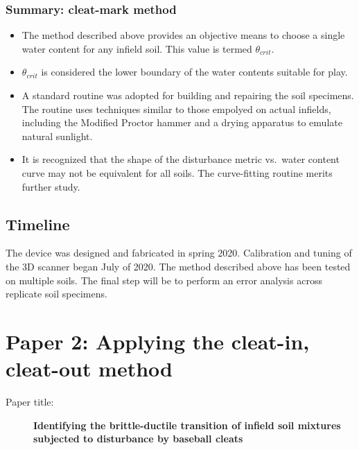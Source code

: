 \documentclass[
  letterpaper,
  openany]{book}
\begin{document}
\hypertarget{summary-cleat-mark-method}{%
\subsubsection{Summary: cleat-mark method}\label{summary-cleat-mark-method}}

\begin{itemize}
\item
  The method described above provides an objective means to choose a single water content for any infield soil. This value is termed \(\theta_{crit}\).
\item
  \(\theta_{crit}\) is considered the lower boundary of the water contents suitable for play.
\item
  A standard routine was adopted for building and repairing the soil specimens. The routine uses techniques similar to those empolyed on actual infields, including the Modified Proctor hammer and a drying apparatus to emulate natural sunlight.
\item
  It is recognized that the shape of the disturbance metric vs.~water content curve may not be equivalent for all soils. The curve-fitting routine merits further study.
\end{itemize}

\hypertarget{timeline}{%
\subsection{Timeline}\label{timeline}}

The device was designed and fabricated in spring 2020. Calibration and tuning of the 3D scanner began July of 2020. The method described above has been tested on multiple soils. The final step will be to perform an error analysis across replicate soil specimens.

\newpage

\hypertarget{paper-2-applying-the-cleat-in-cleat-out-method}{%
\section{Paper 2: Applying the cleat-in, cleat-out method}\label{paper-2-applying-the-cleat-in-cleat-out-method}}

\begin{description}
\item[Paper title:]
\textbf{Identifying the brittle-ductile transition of infield soil mixtures subjected to disturbance by baseball cleats}
\end{description}
\end{document}
